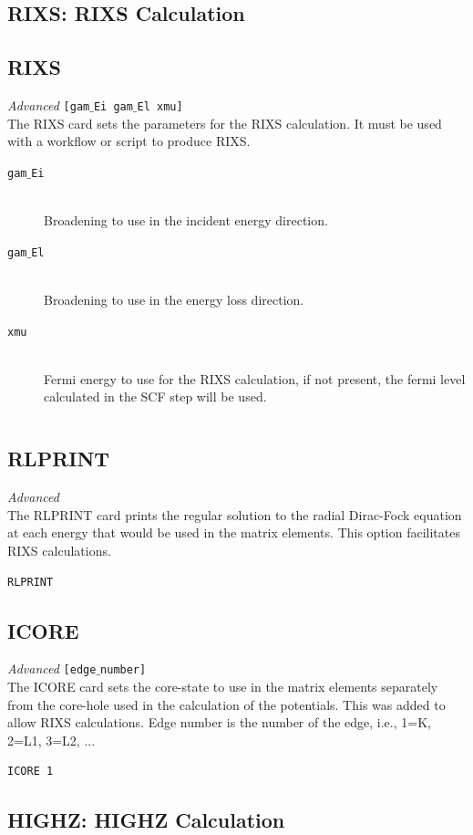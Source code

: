 \documentclass[11pt,oneside]{report} %
\newenvironment{Card}[4]%
      {\vspace{3ex}%
        \subsection{#1}
        \quad\textsl{#3}\newline
        \quad\texttt{#2}\newline%
        \label{card:#4}\\}
      {}
\begin{document}
\subsection{RIXS: RIXS Calculation} 
\label{sec:RIXS-modul}

\begin{Card}{RIXS}{[gam$\_$Ei gam$\_$El xmu]}{Advanced}{rix}
 The RIXS card sets the parameters for the RIXS calculation. It must be used with a workflow or script to produce RIXS.
\begin{description}
\item[\texttt{gam$\_$Ei}]\hfill\\Broadening to use in the incident energy direction.
\item[\texttt{gam$\_$El}]\hfill\\Broadening to use in the energy loss direction.
\item[\texttt{xmu}]\hfill\\Fermi energy to use for the RIXS calculation, if not present, the fermi level calculated in the SCF step will be used.
\end{description}

\begin{verbatim}

\end{verbatim}
\end{Card}

\begin{Card}{RLPRINT}{}{Advanced}{rlp}
The RLPRINT card prints the regular solution to the radial Dirac-Fock equation at each energy that would be used in the matrix elements. This option facilitates RIXS calculations.

\begin{verbatim}
RLPRINT
\end{verbatim}
\end{Card}

\begin{Card}{ICORE}{[edge$\_$number]}{Advanced}{ico}
The ICORE card sets the core-state to use in the matrix elements separately from the core-hole used in the calculation of the potentials. This was added to allow RIXS calculations. Edge number is the number of the edge, i.e., 1=K, 2=L1, 3=L2, ...

\begin{verbatim}
ICORE 1
\end{verbatim}
\end{Card}

\subsection{HIGHZ: HIGHZ Calculation} 
\label{sec:HIGHZ-modul}
\end{document}
